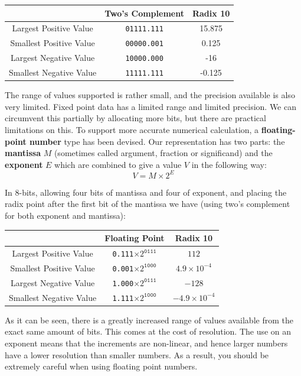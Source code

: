 \documentclass{article}
\begin{document}
	\begin{tabular}{c | c c}
	& Two's Complement & Radix 10 \\ \hline
	Largest Positive Value & \texttt{01111.111} & 15.875 \\
	Smallest Positive Value & \texttt{00000.001} & 0.125 \\
	Largest Negative Value & \texttt{10000.000} & -16 \\
	Smallest Negative Value & \texttt{11111.111} & -0.125
	\end{tabular}
	
	\par 	
	The range of values supported is rather small, and the precision available is also very limited. Fixed point data has a limited range and limited precision. We can circumvent this partially by allocating more bits, but there are practical limitations on this. To support more accurate numerical calculation, a \textbf{floating-point number} type has been devised. Our representation has two parts: the \textbf{mantissa} $M$ (sometimes called argument, fraction or significand) and the \textbf{exponent} $E$ which are combined to give a value $V$ in the following way:
	\[ V = M \times 2^{E} \]
	
	In 8-bits, allowing four bits of mantissa and four of exponent, and placing the radix point after the first bit of the mantissa we have (using two's complement for both exponent and mantissa):
	
	\begin{tabular}{c | c c}
	& Floating Point & Radix 10 \\ \hline
	Largest Positive Value & \texttt{0.111}$\times 2^{\texttt{0111}}$ & $112$ \\
	Smallest Positive Value & \texttt{0.001}$\times 2^{\texttt{1000}}$ & $4.9 \times 10^{-4}$ \\
	Largest Negative Value & \texttt{1.000}$\times 2^{\texttt{0111}}$ & $-128$ \\
	Smallest Negative Value & \texttt{1.111}$\times 2^{\texttt{1000}}$ & $-4.9 \times 10^{-4}$
	\end{tabular}	
	
	As it can be seen, there is a greatly increased range of values available from the exact same amount of bits. This comes at the cost of resolution. The use on an exponent means that the increments are non-linear, and hence larger numbers have a lower resolution than smaller numbers. As a result, you should be extremely careful when using floating point numbers.
	
\end{document}
